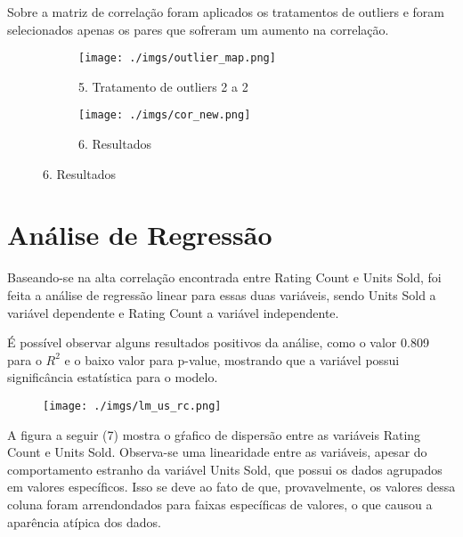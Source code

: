 \documentclass[12pt, a4paper]{article}
\begin{document}
Sobre a matriz de correlação foram aplicados os tratamentos de outliers e foram selecionados apenas os pares que sofreram um aumento na correlação.\\

\FloatBarrier
\begin{figure}[h]
	\hspace{1cm}
  \begin{subfigure}[b]{0.4\textwidth}
    \texttt{[image: ./imgs/outlier\_map.png]}
    \caption*{5. Tratamento de outliers 2 a 2}
    \label{fig:1}
  \end{subfigure}\hspace{0.5cm}
  \begin{subfigure}[b]{0.5\textwidth}
    \texttt{[image: ./imgs/cor\_new.png]}
    \caption*{6. Resultados}
    \label{fig:2}
  \end{subfigure}
\end{figure}
\FloatBarrier

\begin{comment}
\FloatBarrier
\begin{figure}[h]
\texttt{[image: ./imgs/heatmap.png]}
\caption*{Figura 3: Matriz de Correlação}
\end{figure}
\FloatBarrier 
\end{comment}

\section{Análise de Regressão}

Baseando-se na alta correlação encontrada entre Rating Count e Units Sold, foi feita a
análise de regressão linear para essas duas variáveis, sendo Units Sold a variável
dependente e Rating Count a variável independente.

É possível observar alguns resultados positivos da análise, como o valor 0.809 para o $R^{2}$ e o baixo valor para p-value, mostrando que a variável possui significância estatística para o modelo. 


\FloatBarrier
\begin{figure}[h]
\texttt{[image: ./imgs/lm\_us\_rc.png]}
\end{figure}
\FloatBarrier 

A figura a seguir (7) mostra o gŕafico de dispersão entre as variáveis Rating Count e Units Sold. Observa-se uma linearidade entre as variáveis, apesar do comportamento estranho da variável Units Sold, que possui os dados agrupados em valores específicos. Isso se deve ao fato de que, provavelmente, os valores dessa coluna foram arrendondados para faixas específicas de valores, o que causou a aparência atípica dos dados.
\end{document}
